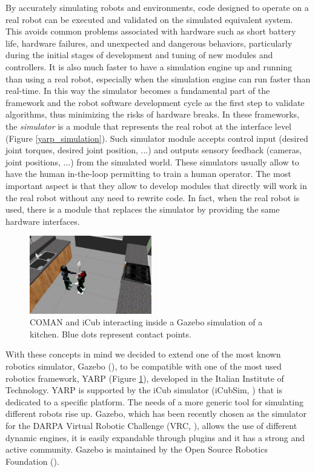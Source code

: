By accurately simulating robots and environments, code designed to operate on a real robot can be executed and validated on the simulated equivalent system. This avoids common problems associated with hardware such as short battery life, hardware failures, and unexpected and dangerous behaviors, particularly during the initial stages of development and tuning of new modules and controllers. 
It is also much faster to have a simulation engine up and running than using a real robot, especially when the simulation engine can run faster than real-time. In this way the simulator becomes a fundamental part of the framework and the robot software development cycle as the first step to validate algorithms, thus minimizing the risks of hardware breaks.
In these frameworks, the \emph{simulator} is a module that represents the real robot at the interface level (Figure \ref{yarp_simulation}). Such simulator module accepts control input (desired joint torques, desired joint position, ...) and outputs sensory feedback (cameras, joint positions, ...) from the simulated world. These simulators usually allow to have the human in-the-loop permitting to train a human operator. The most important aspect is that they allow to develop modules that directly will work in the real robot without any need to rewrite code. In fact, when the real robot is used, there is a module that replaces the simulator by providing the same hardware interfaces. 

\begin{figure}[h!]
  \centering
    \includegraphics[width=0.475\textwidth]{images/coman_icub_gazebo.jpg}
    \caption{COMAN and iCub interacting inside a Gazebo simulation of a kitchen. Blue dots represent contact points.}\label{coman_icub_gazebo}
\end{figure}

With these concepts in mind we decided to extend one of the most known robotics simulator, Gazebo (\cite{koenig2004design}), to be compatible with one of the most used robotics framework, YARP (Figure \ref{coman_icub_gazebo}), developed in the Italian Institute of Technology. 
YARP is supported by the iCub simulator (iCubSim, \cite{Tikhanoff:2008:OSC:1774674.1774684}) that is dedicated to a specific platform. The needs of a more generic tool for simulating different robots rise up. 
Gazebo, which has been recently chosen as the simulator for the DARPA Virtual Robotic Challenge (VRC, \cite{DRC}), allows the use of different dynamic engines, it is easily expandable through plugins and it has a strong and active community. Gazebo is maintained by the Open Source Robotics Foundation (\cite{OSRF}).


